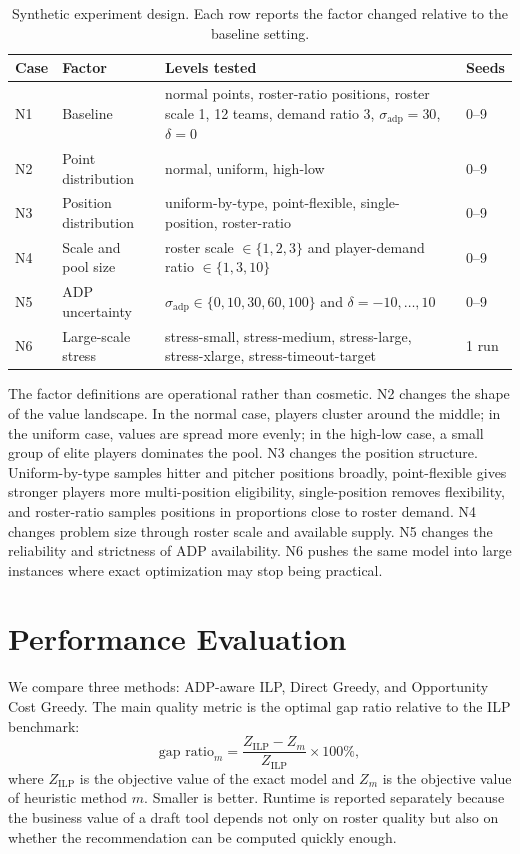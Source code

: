 \documentclass[10pt,a4paper]{article}
\begin{document}
\begin{table}[H]
\centering
\small
\setlength{\tabcolsep}{4pt}
\caption{Synthetic experiment design. Each row reports the factor changed relative to the baseline setting.}
\label{tab:synthetic_design}
\begin{tabular}{p{1.0cm}p{3.2cm}p{5.8cm}p{2.2cm}}
\toprule
Case & Factor & Levels tested & Seeds \\
\midrule
N1 & Baseline & normal points, roster-ratio positions, roster scale 1, 12 teams, demand ratio 3, $\sigma_{\text{adp}}=30$, $\delta=0$ & 0--9 \\
N2 & Point distribution & normal, uniform, high-low & 0--9 \\
N3 & Position distribution & uniform-by-type, point-flexible, single-position, roster-ratio & 0--9 \\
N4 & Scale and pool size & roster scale $\in\{1,2,3\}$ and player-demand ratio $\in\{1,3,10\}$ & 0--9 \\
N5 & ADP uncertainty & $\sigma_{\text{adp}}\in\{0,10,30,60,100\}$ and $\delta=-10,\ldots,10$ & 0--9 \\
N6 & Large-scale stress & stress-small, stress-medium, stress-large, stress-xlarge, stress-timeout-target & 1 run \\
\bottomrule
\end{tabular}
\end{table}

The factor definitions are operational rather than cosmetic. N2 changes the shape of the value landscape. In the normal case, players cluster around the middle; in the uniform case, values are spread more evenly; in the high-low case, a small group of elite players dominates the pool. N3 changes the position structure. Uniform-by-type samples hitter and pitcher positions broadly, point-flexible gives stronger players more multi-position eligibility, single-position removes flexibility, and roster-ratio samples positions in proportions close to roster demand. N4 changes problem size through roster scale and available supply. N5 changes the reliability and strictness of ADP availability. N6 pushes the same model into large instances where exact optimization may stop being practical.

\section{Performance Evaluation}

We compare three methods: ADP-aware ILP, Direct Greedy, and Opportunity Cost Greedy. The main quality metric is the optimal gap ratio relative to the ILP benchmark:
\[
\text{gap ratio}_m=\frac{Z_{\text{ILP}}-Z_m}{Z_{\text{ILP}}}\times 100\%,
\]
where $Z_{\text{ILP}}$ is the objective value of the exact model and $Z_m$ is the objective value of heuristic method $m$. Smaller is better. Runtime is reported separately because the business value of a draft tool depends not only on roster quality but also on whether the recommendation can be computed quickly enough.
\end{document}
